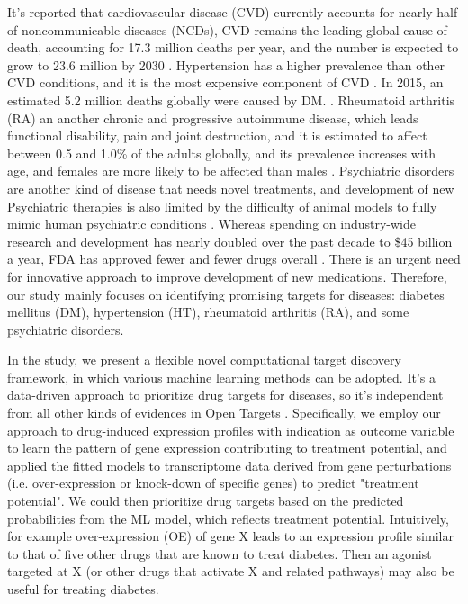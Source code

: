     It's reported that cardiovascular disease (CVD) currently accounts for nearly
    half of noncommunicable diseases (NCDs), CVD remains the leading global cause of
    death, accounting for 17.3 million deaths per year, and the number is expected to grow to 23.6 million by 2030 \cite{laslett2012worldwide}. Hypertension has a higher prevalence
    than other CVD conditions, and it is the most expensive component of CVD \cite{heidenreich2011forecasting}. In 2015, an estimated 5.2 million deaths globally were caused by DM. \cite{mozaffarian2015executive}. Rheumatoid arthritis (RA) an another chronic and progressive autoimmune disease, which leads functional disability, pain and joint destruction, and it is estimated to affect between 0.5 and 1.0\% of the adults globally, and its prevalence increases with age, and females are more likely to be affected than males \cite{kvien2004epidemiology}. Psychiatric disorders are another kind of disease that needs novel treatments, and development of new Psychiatric therapies is also limited by the difficulty of animal models to fully mimic human psychiatric conditions \cite{powell2017transcriptomic}. Whereas spending on industry-wide research and development has nearly doubled over the past decade to \$45 billion a year, FDA has approved fewer and fewer drugs overall \cite{wilson2011drug}. There is an urgent need for innovative approach to improve development of new medications. Therefore, our study mainly focuses on identifying promising targets for diseases: diabetes mellitus (DM), hypertension (HT), rheumatoid arthritis (RA), and some psychiatric disorders.
  
    In the study, we present a flexible novel computational target discovery framework, in which various machine learning methods can be adopted. It's a data-driven approach to prioritize drug targets for diseases, so it's independent from all other kinds of evidences in Open Targets \cite{koscielny2017open}. Specifically, we employ our approach to drug-induced expression profiles with indication as outcome variable to learn the pattern of gene expression contributing to treatment potential, and applied the fitted models to transcriptome data derived from gene perturbations (i.e. over-expression or knock-down of specific genes) to predict "treatment potential". We could then prioritize drug targets based on the predicted probabilities from the ML model, which reflects treatment potential. Intuitively, for example over-expression (OE) of gene X leads to an expression profile similar to that of five other drugs that are known to treat diabetes. Then an agonist targeted at X (or other drugs that activate X and related pathways) may also be useful for treating diabetes. 

